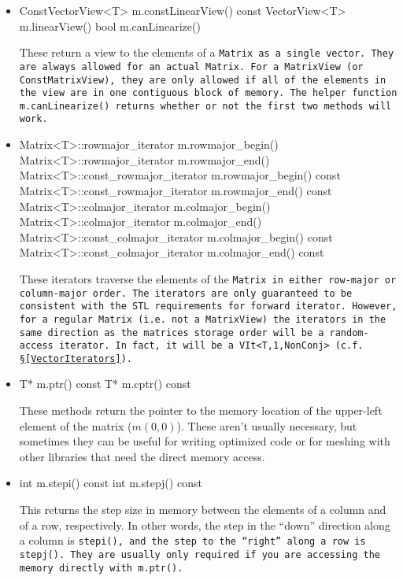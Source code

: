 \begin{itemize}
\item
\begin{tmvcode}
ConstVectorView<T> m.constLinearView() const
VectorView<T> m.linearView()
bool m.canLinearize()
\end{tmvcode}
These return a view to the elements of a \tt{Matrix} as a single vector.  They are always allowed for an actual \tt{Matrix}.  For a \tt{MatrixView} (or \tt{ConstMatrixView}), they are only allowed if all of the elements in the view are in one contiguous block of memory.  The helper function \tt{m.canLinearize()} returns whether or not the first two methods will work.

\item
\begin{tmvcode}
Matrix<T>::rowmajor_iterator m.rowmajor_begin()
Matrix<T>::rowmajor_iterator m.rowmajor_end()
Matrix<T>::const_rowmajor_iterator m.rowmajor_begin() const
Matrix<T>::const_rowmajor_iterator m.rowmajor_end() const
Matrix<T>::colmajor_iterator m.colmajor_begin()
Matrix<T>::colmajor_iterator m.colmajor_end()
Matrix<T>::const_colmajor_iterator m.colmajor_begin() const
Matrix<T>::const_colmajor_iterator m.colmajor_end() const
\end{tmvcode}
These iterators traverse the elements of the \tt{Matrix} 
in either row-major or column-major order.  
The iterators are only guaranteed
to be consistent with the STL requirements for forward iterator.
However, for a regular \tt{Matrix} (i.e. not a \tt{MatrixView}) the iterators in the same direction as the matrices storage order will be a random-access iterator.  In fact, it will be a \tt{VIt<T,1,NonConj>} (c.f. \S\ref{VectorIterators}).

\item
\begin{tmvcode}
T* m.ptr()
const T* m.cptr() const
\end{tmvcode}
These methods return the pointer to the memory location of the upper-left element of the matrix ($m(0,0)$).  These aren't usually necessary, but sometimes they can be useful for writing optimized code or for meshing with other libraries that need the direct memory access.

\item
\begin{tmvcode}
int m.stepi() const
int m.stepj() const
\end{tmvcode}
This returns the step size in memory between the elements of a column and of a row, respectively.  
In other words, the step in the ``down'' direction along a column is \tt{stepi()}, and the step to 
the ``right'' along a row is \tt{stepj()}.
They are usually only required if you are accessing the memory directly with \tt{m.ptr()}.


\end{itemize}
